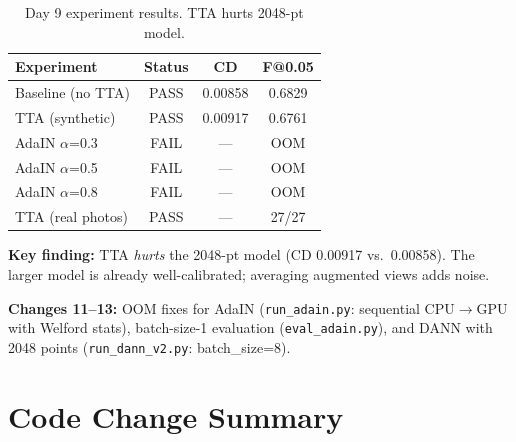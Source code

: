 \documentclass[10pt,twocolumn,letterpaper]{article}
\begin{document}
\begin{table}[h]
\centering
\scriptsize
\begin{tabular}{@{}lccc@{}}
\toprule
\textbf{Experiment} & \textbf{Status} & \textbf{CD} & \textbf{F@0.05} \\
\midrule
Baseline (no TTA) & \textcolor{fixgreen}{PASS} & 0.00858 & 0.6829 \\
TTA (synthetic) & \textcolor{fixgreen}{PASS} & 0.00917 & 0.6761 \\
AdaIN $\alpha$=0.3 & \textcolor{bugred}{FAIL} & --- & OOM \\
AdaIN $\alpha$=0.5 & \textcolor{bugred}{FAIL} & --- & OOM \\
AdaIN $\alpha$=0.8 & \textcolor{bugred}{FAIL} & --- & OOM \\
TTA (real photos) & \textcolor{fixgreen}{PASS} & --- & 27/27 \\
\bottomrule
\end{tabular}
\caption{Day 9 experiment results. TTA hurts 2048-pt model.}
\end{table}

\textbf{Key finding:} TTA \textit{hurts} the 2048-pt model (CD 0.00917 vs.\ 0.00858). The larger model is already well-calibrated; averaging augmented views adds noise.

\textbf{Changes 11--13:} OOM fixes for AdaIN (\texttt{run\_adain.py}: sequential CPU$\to$GPU with Welford stats), batch-size-1 evaluation (\texttt{eval\_adain.py}), and DANN with 2048 points (\texttt{run\_dann\_v2.py}: batch\_size=8).

\section{Code Change Summary}
\end{document}
